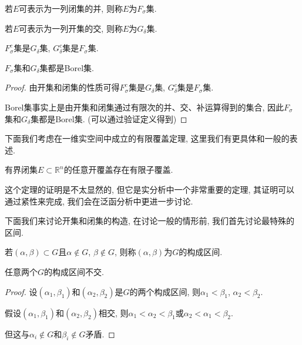 \documentclass[theorem=false,mathfont=none,openany,sub3section]{easybook}
\begin{document}
\begin{definition}
  若$E$可表示为一列闭集的并, 则称$E$为$F_{\sigma}$集.\par
  若$E$可表示为一列开集的交, 则称$E$为$G_{\delta}$集.\par
\end{definition}

\begin{corollary}
  $F_{\sigma}^c$集是$G_{\delta}$集, $G_{\delta}^c$集是$F_{\sigma}$集.\par
  $F_{\sigma}$集和$G_{\delta}$集都是Borel集.\par
\end{corollary}

\begin{proof}
  由开集和闭集的性质可得$F_{\sigma}^c$集是$G_{\delta}$集, $G_{\delta}^c$集是$F_{\sigma}$集.\par
  Borel集事实上是由开集和闭集通过有限次的并、交、补运算得到的集合, 因此$F_{\sigma}$集和$G_{\delta}$集都是Borel集. (可以通过验证定义得到)\par
\end{proof}

下面我们考虑在一维实空间中成立的有限覆盖定理, 这里我们有更具体和一般的表述.\par

\begin{theorem}
  有界闭集$E\subset \mathbb{R}^n$的任意开覆盖存在有限子覆盖.\par
\end{theorem}

\begin{remark}
  这个定理的证明是不太显然的, 但它是实分析中一个非常重要的定理, 其证明可以通过紧性来完成, 我们会在泛函分析中更进一步讨论.\par
\end{remark}

下面我们来讨论开集和闭集的构造, 在讨论一般的情形前, 我们首先讨论最特殊的区间.\par

\begin{definition}
  若$(\alpha, \beta)\subset G$且$\alpha \notin G$, $\beta \notin G$, 则称$(\alpha, \beta)$为$G$的构成区间.\par
\end{definition}

\begin{lemma}
  任意两个$G$的构成区间不交.\par
\end{lemma}

\begin{proof}
  设$(\alpha_1, \beta_1)$和$(\alpha_2, \beta_2)$是$G$的两个构成区间, 则$\alpha_1 < \beta_1$, $\alpha_2 < \beta_2$.\par
  假设$(\alpha_1, \beta_1)$和$(\alpha_2, \beta_2)$相交, 则$\alpha_1 < \alpha_2 < \beta_1$或$\alpha_2 < \alpha_1 < \beta_2$.\par
  但这与$\alpha_i \notin G$和$\beta_i \notin G$矛盾.\par
\end{proof}
\end{document}

